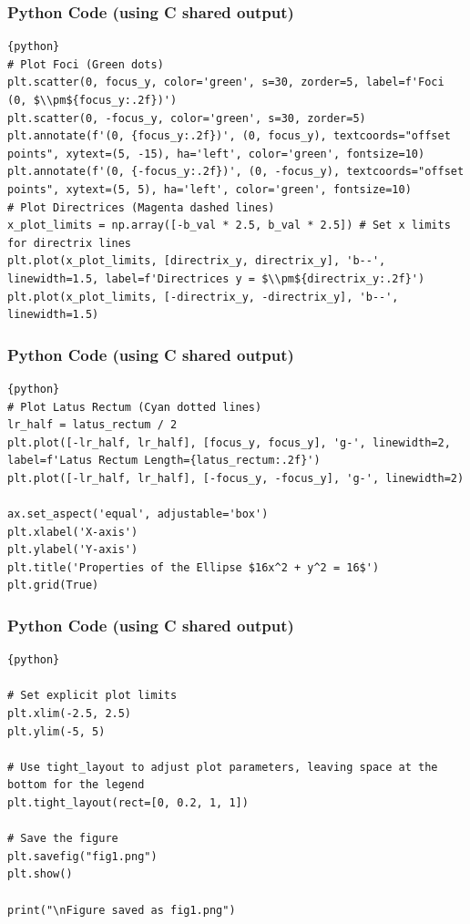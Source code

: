 \documentclass{beamer}
\begin{document}
\begin{frame}[fragile]
\frametitle{Python Code (using C shared output)}
\begin{lstlisting}{python}
# Plot Foci (Green dots)
plt.scatter(0, focus_y, color='green', s=30, zorder=5, label=f'Foci (0, $\\pm${focus_y:.2f})')
plt.scatter(0, -focus_y, color='green', s=30, zorder=5)
plt.annotate(f'(0, {focus_y:.2f})', (0, focus_y), textcoords="offset points", xytext=(5, -15), ha='left', color='green', fontsize=10)
plt.annotate(f'(0, {-focus_y:.2f})', (0, -focus_y), textcoords="offset points", xytext=(5, 5), ha='left', color='green', fontsize=10)
# Plot Directrices (Magenta dashed lines)
x_plot_limits = np.array([-b_val * 2.5, b_val * 2.5]) # Set x limits for directrix lines
plt.plot(x_plot_limits, [directrix_y, directrix_y], 'b--', linewidth=1.5, label=f'Directrices y = $\\pm${directrix_y:.2f}')
plt.plot(x_plot_limits, [-directrix_y, -directrix_y], 'b--', linewidth=1.5)
\end{lstlisting}
\end{frame}

\begin{frame}[fragile]
\frametitle{Python Code (using C shared output)}
\begin{lstlisting}{python}
# Plot Latus Rectum (Cyan dotted lines)
lr_half = latus_rectum / 2
plt.plot([-lr_half, lr_half], [focus_y, focus_y], 'g-', linewidth=2, label=f'Latus Rectum Length={latus_rectum:.2f}')
plt.plot([-lr_half, lr_half], [-focus_y, -focus_y], 'g-', linewidth=2)

ax.set_aspect('equal', adjustable='box')
plt.xlabel('X-axis')
plt.ylabel('Y-axis')
plt.title('Properties of the Ellipse $16x^2 + y^2 = 16$')
plt.grid(True)
\end{lstlisting}
\end{frame}

\begin{frame}[fragile]
\frametitle{Python Code (using C shared output)}
\begin{lstlisting}{python}

# Set explicit plot limits
plt.xlim(-2.5, 2.5)
plt.ylim(-5, 5)

# Use tight_layout to adjust plot parameters, leaving space at the bottom for the legend
plt.tight_layout(rect=[0, 0.2, 1, 1])

# Save the figure
plt.savefig("fig1.png")
plt.show()

print("\nFigure saved as fig1.png")
\end{lstlisting}
\end{frame}
\end{document}

